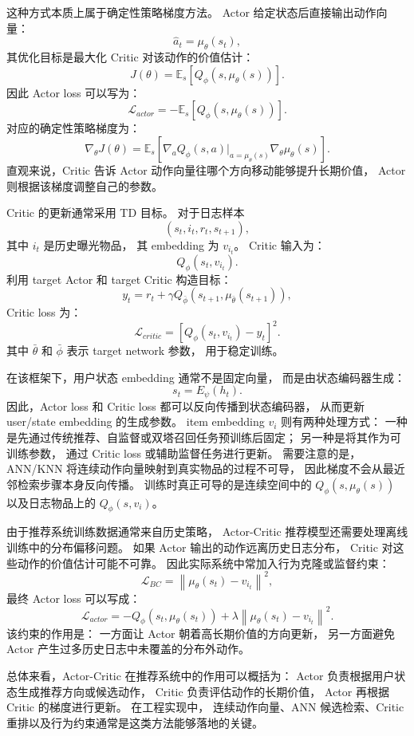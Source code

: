 \documentclass[11pt]{ctexart}
\begin{document}
这种方式本质上属于确定性策略梯度方法。
Actor 给定状态后直接输出动作向量：
\[
\hat{a}_t=\mu_{\theta}(s_t),
\]
其优化目标是最大化 Critic 对该动作的价值估计：
\[
J(\theta)
=
\mathbb{E}_{s}
\left[
Q_{\phi}(s,\mu_{\theta}(s))
\right].
\]
因此 Actor loss 可以写为：
\[
\mathcal{L}_{actor}
=
-
\mathbb{E}_{s}
\left[
Q_{\phi}(s,\mu_{\theta}(s))
\right].
\]
对应的确定性策略梯度为：
\[
\nabla_{\theta}J(\theta)
=
\mathbb{E}_{s}
\left[
\nabla_a Q_{\phi}(s,a)
\big|_{a=\mu_{\theta}(s)}
\nabla_{\theta}\mu_{\theta}(s)
\right].
\]
直观来说，Critic 告诉 Actor 动作向量往哪个方向移动能够提升长期价值，
Actor 则根据该梯度调整自己的参数。

Critic 的更新通常采用 TD 目标。
对于日志样本
\[
(s_t,i_t,r_t,s_{t+1}),
\]
其中 \(i_t\) 是历史曝光物品，
其 embedding 为 \(v_{i_t}\)。
Critic 输入为：
\[
Q_{\phi}(s_t,v_{i_t}).
\]
利用 target Actor 和 target Critic 构造目标：
\[
y_t
=
r_t
+
\gamma
Q_{\bar{\phi}}
\left(
s_{t+1},
\mu_{\bar{\theta}}(s_{t+1})
\right),
\]
Critic loss 为：
\[
\mathcal{L}_{critic}
=
\left[
Q_{\phi}(s_t,v_{i_t})
-
y_t
\right]^2.
\]
其中 \(\bar{\theta}\) 和 \(\bar{\phi}\) 表示 target network 参数，
用于稳定训练。

在该框架下，用户状态 embedding 通常不是固定向量，
而是由状态编码器生成：
\[
s_t=E_{\psi}(h_t).
\]
因此，Actor loss 和 Critic loss 都可以反向传播到状态编码器，
从而更新 user/state embedding 的生成参数。
item embedding \(v_i\) 则有两种处理方式：
一种是先通过传统推荐、自监督或双塔召回任务预训练后固定；
另一种是将其作为可训练参数，
通过 Critic loss 或辅助监督任务进行更新。
需要注意的是，ANN/KNN 将连续动作向量映射到真实物品的过程不可导，
因此梯度不会从最近邻检索步骤本身反向传播。
训练时真正可导的是连续空间中的
\(Q_{\phi}(s,\mu_{\theta}(s))\)
以及日志物品上的
\(Q_{\phi}(s,v_i)\)。

由于推荐系统训练数据通常来自历史策略，
Actor-Critic 推荐模型还需要处理离线训练中的分布偏移问题。
如果 Actor 输出的动作远离历史日志分布，
Critic 对这些动作的价值估计可能不可靠。
因此实际系统中常加入行为克隆或监督约束：
\[
\mathcal{L}_{BC}
=
\left\|
\mu_{\theta}(s_t)
-
v_{i_t}
\right\|^2,
\]
最终 Actor loss 可以写成：
\[
\mathcal{L}_{actor}
=
-
Q_{\phi}(s_t,\mu_{\theta}(s_t))
+
\lambda
\left\|
\mu_{\theta}(s_t)
-
v_{i_t}
\right\|^2.
\]
该约束的作用是：
一方面让 Actor 朝着高长期价值的方向更新，
另一方面避免 Actor 产生过多历史日志中未覆盖的分布外动作。

总体来看，Actor-Critic 在推荐系统中的作用可以概括为：
Actor 负责根据用户状态生成推荐方向或候选动作，
Critic 负责评估动作的长期价值，
Actor 再根据 Critic 的梯度进行更新。
在工程实现中，
连续动作向量、ANN 候选检索、Critic 重排以及行为约束通常是这类方法能够落地的关键。
\end{document}
